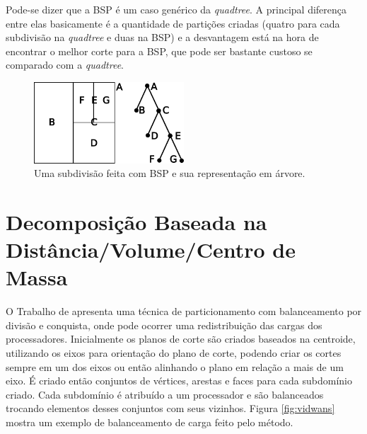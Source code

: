 Pode-se dizer que a BSP é um caso genérico da \textit{quadtree}. A principal diferença entre elas basicamente é a quantidade de partições criadas (quatro para cada subdivisão na \textit{quadtree} e duas na BSP) e a desvantagem está na hora de encontrar o melhor corte para a BSP, que pode ser bastante custoso se comparado com a \textit{quadtree}.

 \begin{figure}[htbp]
     \centering
     \includegraphics[width=0.5\textwidth]{fig/ex_BSP.png}
     \caption{Uma subdivisão feita com BSP e sua representação em árvore.} 
     \label{fig:ex_BSP}
 \end{figure}
 
 
 
 
 
 
 
 
 
 
 
 
 
 
 
 
 
 
 


\section{Decomposição Baseada na Distância/Volume/Centro de Massa}


O Trabalho de \cite{bib:VIDWANS94} apresenta uma técnica de particionamento com balanceamento por divisão e conquista, onde pode ocorrer uma redistribuição das cargas dos processadores. Inicialmente os planos de corte são criados baseados na centroide, utilizando os eixos para orientação do plano de corte, podendo criar os cortes sempre em um dos eixos ou então alinhando o plano em relação a mais de um eixo. É criado então conjuntos de vértices, arestas e faces para cada subdomínio criado. Cada subdomínio é atribuído a um processador e são balanceados trocando elementos desses conjuntos com seus vizinhos. Figura \ref{fig:vidwans} mostra um exemplo de balanceamento de carga feito pelo método.


